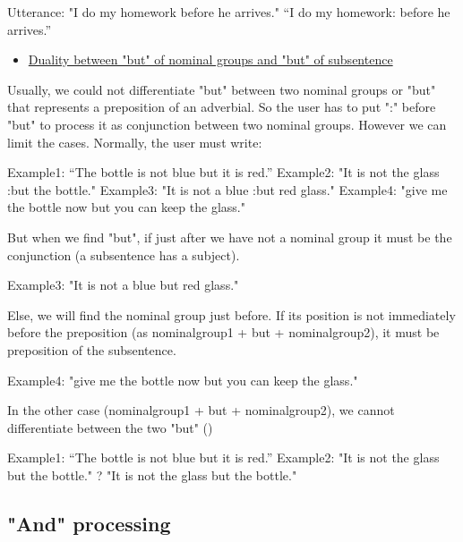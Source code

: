 \documentclass[twoside,a4paper,10pt]{report}
\begin{document}
\small
\begin{verbatimtab}
  Utterance: "I do my homework before he arrives."
  “I do my homework: before he arrives.”
\end{verbatimtab}
\normalsize

\begin{itemize}
    \item  \underline{Duality between "but" of nominal groups and "but" of subsentence}
\end{itemize}
Usually, we could not differentiate "but" between two nominal groups or "but" that represents a preposition of an adverbial. So the user has to put ":" before "but" to process it as conjunction between two nominal groups. However we can limit the cases. Normally, the user must write:


\small
\begin{verbatimtab}
  Example1: “The bottle is not blue but it is red.” 
  Example2: "It is not the glass :but the bottle."
  Example3: "It is not a blue :but red glass."
  Example4: "give me the bottle now but you can keep the glass."
\end{verbatimtab}
\normalsize
But when we find "but", if just after we have not a nominal group it must be the conjunction (a subsentence has a subject). 


\small
\begin{verbatimtab}
  Example3: "It is not a blue but red glass."
\end{verbatimtab}
\normalsize
Else, we will find the nominal group just before. If its position is not immediately before the preposition (as nominal{\textunderscore}group1 + but + nominal{\textunderscore}group2), it must be preposition of the subsentence.


\small
\begin{verbatimtab}
  Example4: "give me the bottle now but you can keep the glass."
\end{verbatimtab}
\normalsize
In the other case (nominal{\textunderscore}group1 + but + nominal{\textunderscore}group2), we cannot differentiate between the two "but" ()


\small
\begin{verbatimtab}
  Example1: “The bottle is not blue but it is red.” 
  Example2: "It is not the glass but the bottle." ? "It is not the glass but the bottle."
\end{verbatimtab}
\normalsize

\subsection{"And" processing}
\label{3dd83b6ed393cdcc2a450375a4147efc}%
\end{document}

